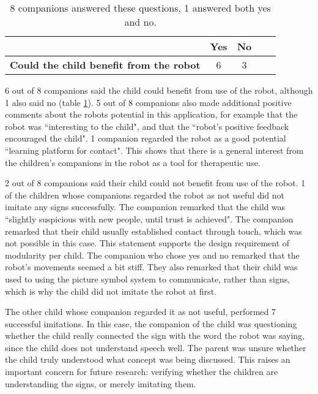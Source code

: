 \begin{table}
  \centering
  \renewcommand{\arraystretch}{1.2}
  \begin{tabular}{|p{6cm}|c|c|c|c|}
    \hline
     & 
    \textbf{Yes} &
    \textbf{No} \\\hline
    \textbf{Could the child benefit from the robot} & 6 & 3\\ \hline
  \end{tabular}
  \caption{8 companions answered these questions, 1 answered both yes and no.}
  \label{table:benefit}
\end{table}


6 out of 8 companions said the child could benefit from use of the robot, although 1 also said no (table \ref{table:benefit}). 5 out of 8 companions also made additional positive comments about the robots potential in this application, for example that the robot was ``interesting to the child", and that the ``robot's positive feedback encouraged the child". 1 companion regarded the robot as a good potential ``learning platform for contact". This shows that there is a general interest from the children's companions in the robot as a tool for therapeutic use. 

2 out of 8 companions said their child could not benefit from use of the robot. 1 of the children whose companions regarded the robot as not useful did not imitate any signs successfully. The companion remarked that the child was ``slightly suspicious with new people, until trust is achieved". The companion remarked that their child usually established contact through touch, which was not possible in this case. This statement supports the design requirement of modularity per child. The companion who chose yes and no remarked that the robot's movements seemed a bit stiff. They also remarked that their child was used to using the picture symbol system to communicate, rather than signs, which is why the child did not imitate the robot at first.

The other child whose companion regarded it as not useful, performed 7 successful imitations. In this case, the companion of the child was questioning whether the child really connected the sign with the word the robot was saying, since the child does not understand speech well. The parent was unsure whether the child truly understood what concept was being discussed. This raises an important concern for future research: verifying whether the children are understanding the signs, or merely imitating them.


